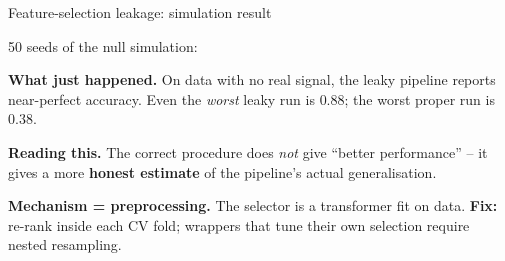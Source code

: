 \documentclass[10pt,compress,t,notes=noshow, xcolor=table]{beamer}
\begin{document}
\begin{frame}{Feature-selection leakage: simulation result}
\label{leakage-feature-selection-results}

50 seeds of the null simulation:

\medskip

\begin{center}
\end{center}

\medskip

\textbf{What just happened.} On data with no real signal, the leaky pipeline reports near-perfect accuracy. Even the \emph{worst} leaky run is $0.88$; the worst proper run is $0.38$.

\medskip

\textbf{Reading this.} The correct procedure does \emph{not} give ``better performance'' -- it gives a more \textbf{honest estimate} of the pipeline's actual generalisation.

\medskip

\textbf{Mechanism = preprocessing.} The selector is a transformer fit on data. \textbf{Fix:} re-rank inside each CV fold; wrappers that tune their own selection require nested resampling.
\end{frame}
\end{document}
